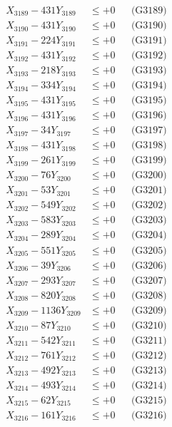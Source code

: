 \documentclass[a4paper,10pt]{article}
\begin{document}
{\begin{align}
X_{3189} - 431Y_{3189} &\leq +0 && \text{(G3189)} \\
X_{3190} - 431Y_{3190} &\leq +0 && \text{(G3190)} \\
\allowbreak
X_{3191} - 224Y_{3191} &\leq +0 && \text{(G3191)} \\
X_{3192} - 431Y_{3192} &\leq +0 && \text{(G3192)} \\
X_{3193} - 218Y_{3193} &\leq +0 && \text{(G3193)} \\
X_{3194} - 334Y_{3194} &\leq +0 && \text{(G3194)} \\
X_{3195} - 431Y_{3195} &\leq +0 && \text{(G3195)} \\
X_{3196} - 431Y_{3196} &\leq +0 && \text{(G3196)} \\
X_{3197} - 34Y_{3197} &\leq +0 && \text{(G3197)} \\
X_{3198} - 431Y_{3198} &\leq +0 && \text{(G3198)} \\
X_{3199} - 261Y_{3199} &\leq +0 && \text{(G3199)} \\
X_{3200} - 76Y_{3200} &\leq +0 && \text{(G3200)} \\
\allowbreak
X_{3201} - 53Y_{3201} &\leq +0 && \text{(G3201)} \\
X_{3202} - 549Y_{3202} &\leq +0 && \text{(G3202)} \\
X_{3203} - 583Y_{3203} &\leq +0 && \text{(G3203)} \\
X_{3204} - 289Y_{3204} &\leq +0 && \text{(G3204)} \\
X_{3205} - 551Y_{3205} &\leq +0 && \text{(G3205)} \\
X_{3206} - 39Y_{3206} &\leq +0 && \text{(G3206)} \\
X_{3207} - 293Y_{3207} &\leq +0 && \text{(G3207)} \\
X_{3208} - 820Y_{3208} &\leq +0 && \text{(G3208)} \\
X_{3209} - 1136Y_{3209} &\leq +0 && \text{(G3209)} \\
X_{3210} - 87Y_{3210} &\leq +0 && \text{(G3210)} \\
\allowbreak
X_{3211} - 542Y_{3211} &\leq +0 && \text{(G3211)} \\
X_{3212} - 761Y_{3212} &\leq +0 && \text{(G3212)} \\
X_{3213} - 492Y_{3213} &\leq +0 && \text{(G3213)} \\
X_{3214} - 493Y_{3214} &\leq +0 && \text{(G3214)} \\
X_{3215} - 62Y_{3215} &\leq +0 && \text{(G3215)} \\
X_{3216} - 161Y_{3216} &\leq +0 && \text{(G3216)} \\

\end{align}}
\end{document}
